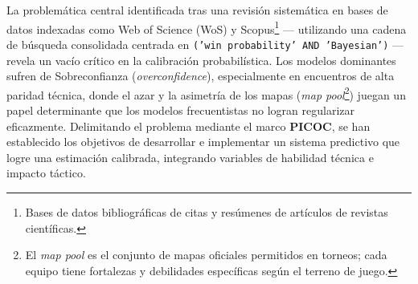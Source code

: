\documentclass[twocolumn,10pt]{article}
\begin{document}
La problemática central identificada tras una revisión sistemática en bases de datos indexadas como Web of Science (WoS) y Scopus\footnote{Bases de datos bibliográficas de citas y resúmenes de artículos de revistas científicas.} — utilizando una cadena de búsqueda consolidada centrada en \texttt{('win probability' AND 'Bayesian')} — revela un vacío crítico en la calibración probabilística. Los modelos dominantes sufren de Sobreconfianza (\textit{overconfidence}), especialmente en encuentros de alta paridad técnica, donde el azar y la asimetría de los mapas (\textit{map pool}\footnote{El \textit{map pool} es el conjunto de mapas oficiales permitidos en torneos; cada equipo tiene fortalezas y debilidades específicas según el terreno de juego.}) juegan un papel determinante que los modelos frecuentistas no logran regularizar eficazmente. Delimitando el problema mediante el marco \textbf{PICOC}, se han establecido los objetivos de desarrollar e implementar un sistema predictivo que logre una estimación calibrada, integrando variables de habilidad técnica e impacto táctico.
\end{document}
